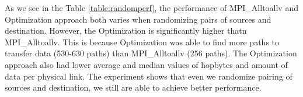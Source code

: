 

As we see in the Table \ref{table:randomperf}, the performance of MPI\_Alltoallv and Optimization approach both varies when randomizing pairs of sources and destination. However, the Optimization is significantly higher thatn MPI\_Alltoallv. This is because Optimization was able to find more paths to transfer data (530-630 paths) than MPI\_Alltoallv (256 paths). The Optimization approach also had lower average and median values of hopbytes and amount of data per physical link. The experiment shows that even we randomize pairing of sources and destination, we still are able to achieve better performance.
